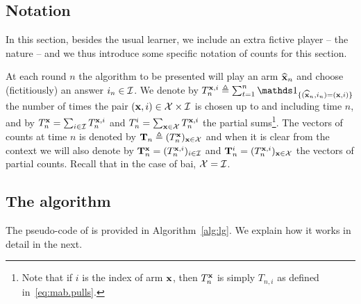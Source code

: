 
\subsection{Notation}

In this section, besides the usual learner, we include an extra fictive player -- the nature -- and we thus introduce some specific notation of counts for this section.

At each round $n$ the algorithm to be presented will play an arm $\widehat{{\bf x}}_n$ and choose (fictitiously) an answer $i_n\in\mathcal{I}$. We denote by $T_n^{\bx,i} \eqdef\sum_{t=1}^n \ind_{\{(\hbx_n,i_n)=(\bx,i)\}}$ the number of times the pair $({\bf x},i)\in\mathcal{X}\times\mathcal{I}$ is chosen up to and including time $n$, and by $T_n^{\bf x} =\sum_{i\in\mathcal{I}} T_n^{{\bf x},i}$ and $T_n^i =\sum_{{\bf x}\in\mathcal{X}} T_n^{{\bf x},i}$ the partial sums\footnote{Note that if $i$ is the index of arm ${\bf x}$, then $T_n^{\bf x}$ is simply $T_{n,i}$ as defined in~\eqref{eq:mab.pulls}.}. The vectors of counts at time $n$ is denoted by ${\bf T}_n \triangleq (T_n^{\bf x})_{{\bf x}\in\mathcal{X}}$
and when it is clear from the context we will also denote by ${\bf T}_n^{{\bf x}} = (T_n^{{\bf x},i})_{i\in\mathcal{I}}$ and ${\bf T}_n^i = (T_n^{{\bf x},i})_{{\bf x}\in\mathcal{X}}$ the vectors of partial counts. Recall that in the case of \gls{bai}, $\mathcal{X}=\mathcal{I}$.



\subsection{The \LG{} algorithm}

The pseudo-code of \LG{} is provided in Algorithm~\ref{alg:lg}. We explain how it works in detail in the next.

